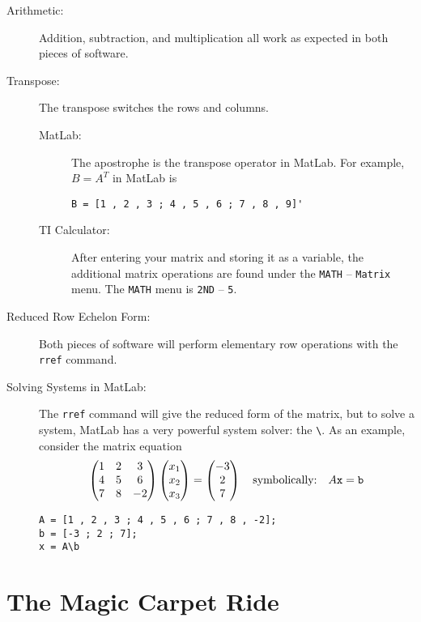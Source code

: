 \begin{description}
    \item[Arithmetic:] Addition, subtraction, and multiplication all work as expected in
        both pieces of software.
    \item[Transpose:] The transpose switches the rows and columns.
        \begin{description}
            \item[MatLab:] The apostrophe is the transpose operator in MatLab. For
                example, $B=A^T$ in MatLab is
\begin{verbatim}
B = [1 , 2 , 3 ; 4 , 5 , 6 ; 7 , 8 , 9]'
\end{verbatim}
            \item[TI Calculator:] After entering your matrix and storing it as a variable,
                the additional matrix operations are found under the \texttt{MATH} --
                \texttt{Matrix} menu.  The \texttt{MATH} menu is \texttt{2ND} --
                \texttt{5}.
        \end{description}
    \item[Reduced Row Echelon Form:] Both pieces of software will perform elementary row
        operations with the \texttt{rref} command.
    \item[Solving Systems in MatLab:] The \texttt{rref} command will give the reduced form
        of the matrix, but to solve a system, MatLab has a very powerful system solver:
        the \verb|\|.  As an example, consider the matrix equation
        \[ \begin{pmatrix} 1 & 2 & 3 \\ 4 & 5 & 6 \\ 7 & 8 & -2 \end{pmatrix} \begin{pmatrix} x_1 \\ x_2 \\ x_3 \end{pmatrix} =
        \begin{pmatrix} -3 \\ 2 \\ 7 \end{pmatrix} \quad \text{symbolically:} \quad A \texttt{x} =
    \texttt{b} \]
\begin{verbatim}
A = [1 , 2 , 3 ; 4 , 5 , 6 ; 7 , 8 , -2];
b = [-3 ; 2 ; 7];
x = A\b
\end{verbatim}
\end{description}


\newpage
\newpage\section{The Magic Carpet Ride}

